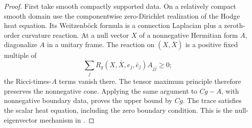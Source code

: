 \begin{proof}
First take smooth compactly supported data.  On a relatively compact
smooth domain use the componentwise zero-Dirichlet realization of
the Hodge heat equation.  Its Weitzenb\"ock formula is a connection
Laplacian plus a zeroth-order curvature reaction.  At a null vector
$X$ of a nonnegative Hermitian form $A$, diagonalize $A$ in a unitary
frame.  The reaction on $(X,\bar X)$ is a positive fixed multiple of
\[
 \sum_j R_g(X,\bar X,e_j,\bar e_j)A_{j\bar j}\ge0;
\]
the Ricci-times-$A$ terms vanish there.  The tensor maximum principle
therefore preserves the nonnegative cone.  Applying the same argument
to $Cg-A$, with nonnegative boundary data, proves the upper bound by
$Cg$.  The trace satisfies the scalar heat equation, including the
zero boundary condition.  This is the null-eigenvector mechanism in
\cite[Section~2]{NiTamStructure}.


\end{proof}
